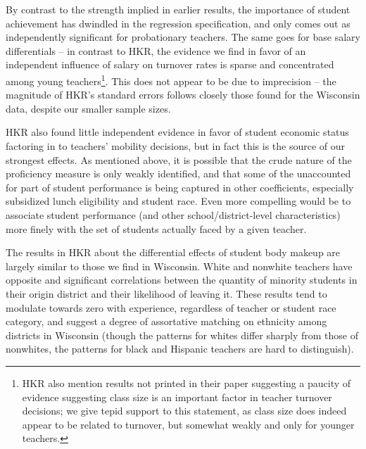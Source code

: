 \documentclass[12pt,]{article}
\let\rmarkdownfootnote\footnote%
\def\footnote{\protect\rmarkdownfootnote}
\begin{document}
By contrast to the strength implied in earlier results, the importance
of student achievement has dwindled in the regression specification, and
only comes out as independently significant for probationary teachers.
The same goes for base salary differentials -- in contrast to HKR, the
evidence we find in favor of an independent influence of salary on
turnover rates is sparse and concentrated among young teachers\footnote{HKR
  also mention results not printed in their paper suggesting a paucity
  of evidence suggesting class size is an important factor in teacher
  turnover decisions; we give tepid support to this statement, as class
  size does indeed appear to be related to turnover, but somewhat weakly
  and only for younger teachers.}. This does not appear to be due to
imprecision -- the magnitude of HKR's standard errors follows closely
those found for the Wisconsin data, despite our smaller sample sizes.

HKR also found little independent evidence in favor of student economic
status factoring in to teachers' mobility decisions, but in fact this is
the source of our strongest effects. As mentioned above, it is possible
that the crude nature of the proficiency measure is only weakly
identified, and that some of the unaccounted for part of student
performance is being captured in other coefficients, especially
subsidized lunch eligibility and student race. Even more compelling
would be to associate student performance (and other
school/district-level characteristics) more finely with the set of
students actually faced by a given teacher.

The results in HKR about the differential effects of student body makeup
are largely similar to those we find in Wisconsin. White and nonwhite
teachers have opposite and significant correlations between the quantity
of minority students in their origin district and their likelihood of
leaving it. These results tend to modulate towards zero with experience,
regardless of teacher or student race category, and suggest a degree of
assortative matching on ethnicity among districts in Wisconsin (though
the patterns for whites differ sharply from those of nonwhites, the
patterns for black and Hispanic teachers are hard to distinguish).
\end{document}
